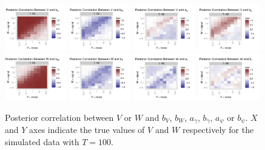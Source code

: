 \documentclass{article}
\begin{document}
\begin{figure}[!h]
\centering
\includegraphics[width=0.24\textwidth]{corplot1}
\includegraphics[width=0.24\textwidth]{corplot2}
\includegraphics[width=0.24\textwidth]{corplot3}
\includegraphics[width=0.24\textwidth]{corplot4}
\includegraphics[width=0.24\textwidth]{corplot5}
\includegraphics[width=0.24\textwidth]{corplot6}
\includegraphics[width=0.24\textwidth]{corplot7}
\includegraphics[width=0.24\textwidth]{corplot8}
\caption{Posterior correlation between $V$ or $W$ and $b_V$, $b_W$, $a_\gamma$, $b_\gamma$, $a_\psi$ or $b_\psi$. $X$ and $Y$ axes indicate the true values of $V$ and $W$ respectively for the simulated data with $T=100$.}
\label{corplot}
\end{figure}
\end{document}
